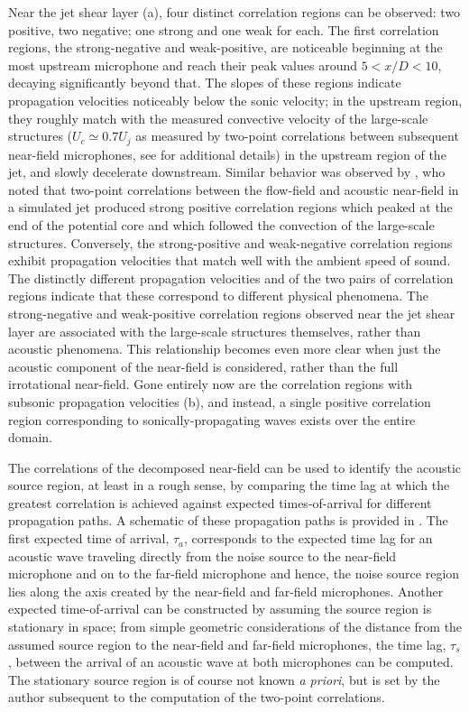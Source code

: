 Near the jet shear layer (a), four distinct correlation regions can be observed: two positive, two negative; one strong and one weak for each. 
The first correlation regions, the strong-negative and weak-positive, are noticeable beginning at the most upstream microphone and reach their peak values around $5 < x/D < 10$, decaying significantly beyond that.
The slopes of these regions indicate propagation velocities noticeably below the sonic velocity; in the upstream region, they roughly match with the measured convective velocity of the large-scale structures ($U_c \simeq 0.7 U_j$ as measured by two-point correlations between subsequent near-field microphones, see \citet{Crawley2015} for additional details) in the upstream region of the jet, and slowly decelerate downstream.
Similar behavior was observed by \citet{Bogey2007}, who noted that two-point correlations between the flow-field and acoustic near-field in a simulated jet produced strong positive correlation regions which peaked at the end of the potential core and which followed the convection of the large-scale structures.
Conversely, the strong-positive and weak-negative correlation regions exhibit propagation velocities that match well with the ambient speed of sound. 
The distinctly different propagation velocities and of the two pairs of correlation regions indicate that these correspond to different physical phenomena.
The strong-negative and weak-positive correlation regions observed near the jet shear layer are associated with the large-scale structures themselves, rather than acoustic phenomena. 
This relationship becomes even more clear when just the acoustic component of the near-field is considered, rather than the full irrotational near-field. 
Gone entirely now are the correlation regions with subsonic propagation velocities (b), and instead, a single positive correlation region corresponding to sonically-propagating waves exists over the entire domain. 

The correlations of the decomposed near-field can be used to identify the acoustic source region, at least in a rough sense, by comparing the time lag at which the greatest correlation is achieved against expected times-of-arrival for different propagation paths.
A schematic of these propagation paths is provided in .
The first expected time of arrival, $\tau_a$, corresponds to the expected time lag for an acoustic wave traveling directly from the noise source to the near-field microphone and on to the far-field microphone and hence, the noise source region lies along the axis created by the near-field and far-field microphones.
Another expected time-of-arrival can be constructed by assuming the source region is stationary in space; from simple geometric considerations of the distance from the assumed source region to the near-field and far-field microphones, the time lag, $\tau_s$, between the arrival of an acoustic wave at both microphones can be computed.
The stationary source region is of course not known \textit{a priori}, but is set by the author subsequent to the computation of the two-point correlations.

